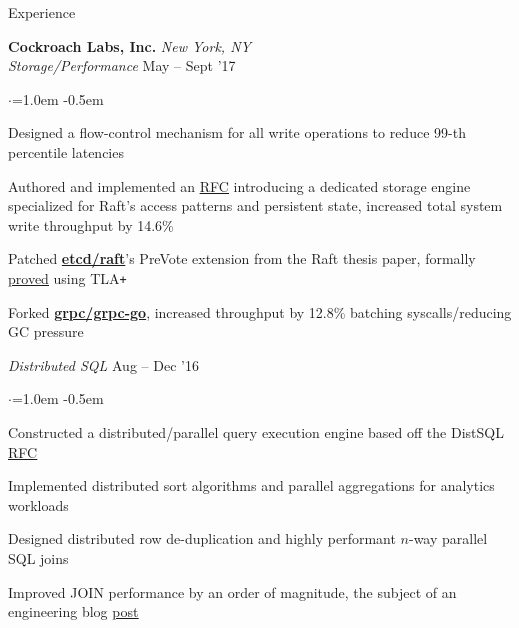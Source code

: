 \documentclass{resume} %
\begin{document}
\begin{rSection}{Experience}


  {\bf Cockroach Labs, Inc.}  \hfill  {\em New York, NY}
  \\
  {\em Storage/Performance}  \hfill  {May -- Sept '17}
  \smallskip
  \begin{list}{$\cdot$}{\leftmargin=1.0em}
  \itemsep -0.5em \vspace{-0.5em}
    \item Designed a flow-control mechanism for all write operations to reduce
      99-th percentile latencies
    \item Authored and implemented an
      \href{https://github.com/cockroachdb/cockroach/pull/16361}{\underline {RFC}} introducing
      a dedicated storage
      engine specialized for Raft's access patterns and persistent state, increased
      total system write throughput by 14.6\%
    \item Patched
      \href{https://github.com/coreos/etcd/pull/8288}{\textbf{etcd/raft}}'s
      PreVote extension from the Raft thesis paper, formally
      \href{https://github.com/irfansharif/raft.tla/commit/22b05818b6bcfe6719a708f2270a1308fecbc0fa}{\underline {proved}}
      using TLA\texttt{+}
    \item Forked \href{https://github.com/irfansharif/grpc-go}{\textbf{grpc/grpc-go}},
      increased throughput by 12.8\% batching syscalls/reducing GC pressure

  \end{list}
  {\em Distributed SQL}  \hfill  {Aug -- Dec '16}
  \smallskip
  \begin{list}{$\cdot$}{\leftmargin=1.0em}
  \itemsep -0.5em \vspace{-0.5em}
    \item Constructed a distributed/parallel query execution engine based off
      the DistSQL
      \href{https://github.com/cockroachdb/cockroach/blob/master/docs/RFCS/20160421_distributed_sql.md}{\underline
      {RFC}}
    \item Implemented distributed sort algorithms and parallel aggregations for
      analytics workloads
    \item Designed distributed row de-duplication and highly performant $n$-way
      parallel SQL joins
    \item Improved JOIN performance by an order of magnitude, the
      subject of an engineering blog
      \href{https://www.cockroachlabs.com/blog/better-sql-joins-in-cockroachdb/}{\underline
      {post}}
  \end{list}
  \vspace{0.5em}


\end{rSection}
\end{document}
